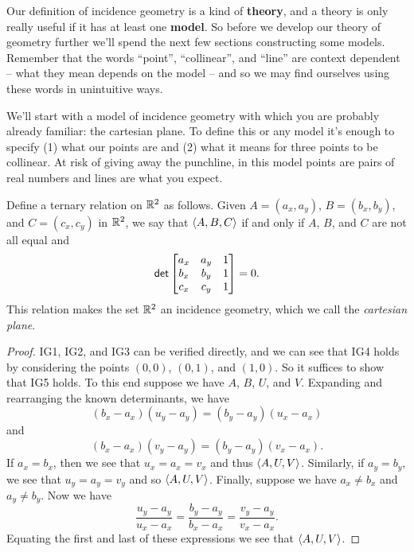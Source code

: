 Our definition of incidence geometry is a kind of \textbf{theory}, and a theory is only really useful if it has at least one \textbf{model}.
So before we develop our theory of geometry further we'll spend the next few sections constructing some models.
Remember that the words ``point'', ``collinear'', and ``line'' are context dependent -- what they mean depends on the model -- and so we may find ourselves using these words in unintuitive ways.

We'll start with a model of incidence geometry with which you are probably already familiar: the cartesian plane.
To define this or any model it's enough to specify (1) what our points are and (2) what it means for three points to be collinear.
At risk of giving away the punchline, in this model points are pairs of real numbers and lines are what you expect.

\begin{prop} \label{prop:rr2-incidence-geo}
Define a ternary relation on \(\mathbb{R}^2\) as follows.
Given \(A = (a_x, a_y)\), \(B = (b_x, b_y)\), and \(C = (c_x, c_y)\) in \(\mathbb{R}^2\), we say that \(\langle A, B, C \rangle\) if and only if \(A\), \(B\), and \(C\) are not all equal and \[ \mathsf{det} \begin{bmatrix} a_x & a_y & 1 \\ b_x & b_y & 1 \\ c_x & c_y & 1 \end{bmatrix} = 0. \]
This relation makes the set \(\mathbb{R}^2\) an incidence geometry, which we call the \emph{cartesian plane}.
\end{prop}

\begin{proof}
IG1, IG2, and IG3 can be verified directly, and we can see that IG4 holds by considering the points \((0,0)\), \((0,1)\), and \((1,0)\).
So it suffices to show that IG5 holds.
To this end suppose we have \(A\), \(B\), \(U\), and \(V\).
Expanding and rearranging the known determinants, we have \[ (b_x - a_x)(u_y - a_y) = (b_y - a_y)(u_x - a_x) \] and \[ (b_x - a_x)(v_y - a_y) = (b_y - a_y)(v_x - a_x). \]
If \(a_x = b_x\), then we see that \(u_x = a_x = v_x\) and thus \(\langle A, U, V \rangle\).
Similarly, if \(a_y = b_y\), we see that \(u_y = a_y = v_y\) and so \(\langle A, U, V \rangle\).
Finally, suppose we have \(a_x \neq b_x\) and \(a_y \neq b_y\).
Now we have \[ \frac{u_y - a_y}{u_x - a_x} = \frac{b_y - a_y}{b_x - a_x} = \frac{v_y - a_y}{v_x - a_x}. \]
Equating the first and last of these expressions we see that \(\langle A, U, V \rangle\).
\end{proof}

